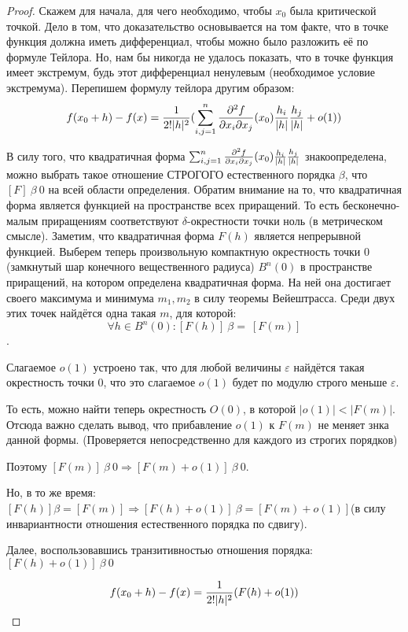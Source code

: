 \begin{proof}
Скажем для начала, для чего необходимо, чтобы $x_0$ была критической точкой. Дело в том, что доказательство основывается на том факте, что в точке функция должна иметь дифференциал, чтобы можно было разложить её по формуле Тейлора. Но, нам бы никогда не удалось показать, что в точке функция имеет экстремум, будь этот дифференциал ненулевым (необходимое условие экстремума).
Перепишем формулу тейлора другим образом:
$$f(x_0+h) - f(x) = {1 \over 2!|h|^2} (\sum_{i,j=1}^{n}{\partial^2 f \over \partial x_i \partial x_j}(x_0){h_i \over |h|} {h_j \over |h|}+o(1))$$

В силу того, что квадратичная форма $\sum_{i,j=1}^{n}{\partial^2 f \over \partial x_i \partial x_j}(x_0){h_i \over |h|} {h_j \over |h|}$ знакоопределена, можно выбрать такое отношение СТРОГОГО естественного порядка $\beta$, что $[F]\ \beta\ 0$ на всей области определения.
Обратим внимание на то, что квадратичная форма является функцией на пространстве всех приращений. То есть бесконечно-малым приращениям соответствуют $\delta$-окрестности точки ноль (в метрическом смысле).
Заметим, что квадратичная форма $F(h)$  является непрерывной функцией. Выберем теперь произвольную компактную окрестность точки 0 (замкнутый шар конечного вещественного радиуса) $B^n(0)$ в пространстве приращений, на котором определена квадратичная форма. На ней она достигает своего максимума и минимума $m_1, m_2$ в силу теоремы Вейештрасса. Среди двух этих точек найдётся одна такая $m$, для которой: $$\forall h \in B^n{(0)}: [F(h)]\ {\beta=}\  [F(m)]$$. 


Слагаемое $o(1)$ устроено так, что для любой величины $\varepsilon$ найдётся такая окрестность точки $0$, что это слагаемое $o(1)$ будет по модулю строго меньше $\varepsilon$.

То есть, можно найти теперь окрестность $O(0)$, в которой $|o(1)| < |F(m)|$. Отсюда важно сделать вывод, что прибавление $o(1)$ к $F(m)$ не меняет знка данной формы. (Проверяется непосредственно для каждого из строгих порядков)


Поэтому $[F(m)]\ \beta\ 0\Rightarrow [F(m) + o(1)]\ \beta\ 0$.

Но, в то же время: $[F(h)] \beta= [F(m)] \Rightarrow [F(h)+o(1)]\ \beta= [F(m)+o(1)]$(в силу инвариантности отношения естественного порядка по сдвигу).

Далее, воспользовавшись транзитивностью отношения порядка: $[F(h)+o(1)]\ \beta\  0$

$$f(x_0+h) - f(x) = {1 \over 2!|h|^2} (F(h)+o(1))$$


\end{proof}

